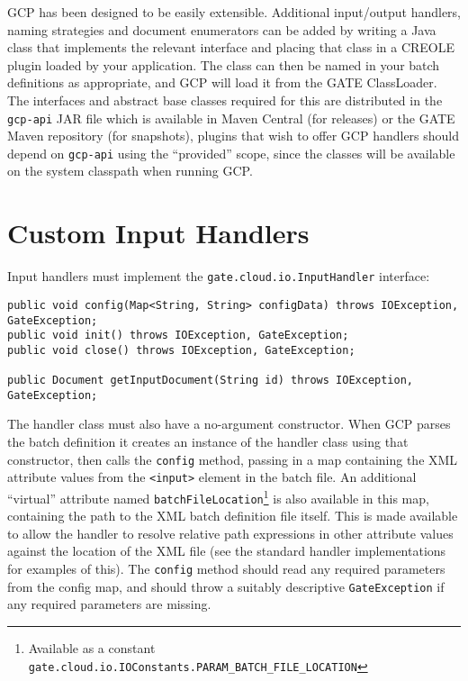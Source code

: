 GCP has been designed to be easily extensible.  Additional input/output
handlers, naming strategies and document enumerators can be added by writing a
Java class that implements the relevant interface and placing that class in a
CREOLE plugin loaded by your application.  The class can then be named in your
batch definitions as appropriate, and GCP will load it from the GATE
ClassLoader.  The interfaces and abstract base classes required for this are
distributed in the \verb!gcp-api! JAR file which is available in Maven Central
(for releases) or the GATE Maven repository (for snapshots), plugins that wish
to offer GCP handlers should depend on \verb!gcp-api! using the ``provided''
scope, since the classes will be available on the system classpath when running
GCP.

\section{Custom Input Handlers}\label{sec:extending:input}

Input handlers must implement the \verb!gate.cloud.io.InputHandler! interface:

\begin{lstlisting}[breaklines]
public void config(Map<String, String> configData) throws IOException, GateException;
public void init() throws IOException, GateException;
public void close() throws IOException, GateException;

public Document getInputDocument(String id) throws IOException, GateException;
\end{lstlisting}

The handler class must also have a no-argument constructor.  When GCP parses
the batch definition it creates an instance of the handler class using that
constructor, then calls the \verb!config! method, passing in a map containing
the XML attribute values from the \verb!<input>! element in the batch file.  An
additional ``virtual'' attribute named
\verb!batchFileLocation!\footnote{Available as a constant
{\tt gate.cloud.io.IOConstants.PARAM\_BATCH\_FILE\_LOCATION}} is also available
in this map, containing the path to the XML batch definition file itself.  This
is made available to allow the handler to resolve relative path expressions in
other attribute values against the location of the XML file (see the standard
handler implementations for examples of this).  The \verb!config! method should
read any required parameters from the config map, and should throw a suitably
descriptive \verb!GateException! if any required parameters are missing.

